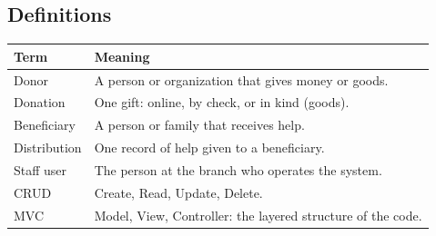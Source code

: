 \subsection{Definitions}

\begin{center}
\small
\begin{tabularx}{\textwidth}{@{}L{0.20\textwidth}Y@{}}
\toprule
\textbf{Term} & \textbf{Meaning} \\
\midrule
Donor & A person or organization that gives money or goods. \\
Donation & One gift: online, by check, or in kind (goods). \\
Beneficiary & A person or family that receives help. \\
Distribution & One record of help given to a beneficiary. \\
Staff user & The person at the branch who operates the system. \\
CRUD & Create, Read, Update, Delete. \\
MVC & Model, View, Controller: the layered structure of the code. \\
\bottomrule
\end{tabularx}
\end{center}
